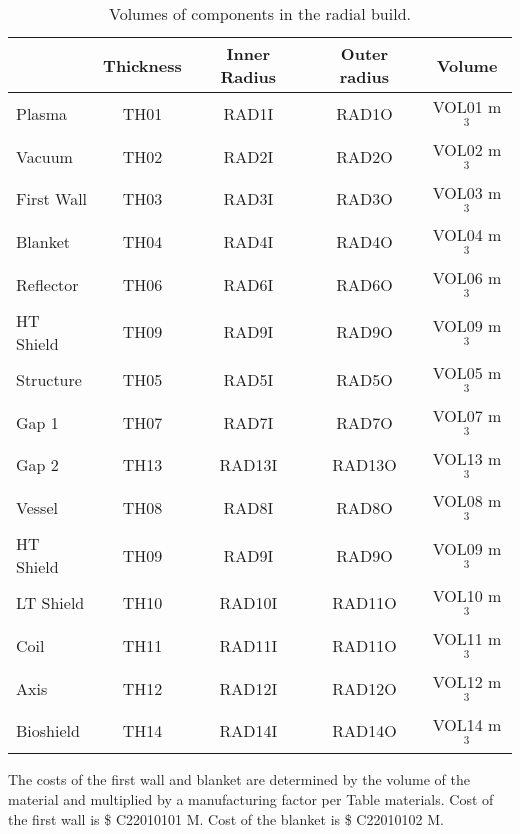 \begin{table}[ht!]
    \centering
    \begin{tabular}{l c  c c c}
    \hline
        &	Thickness	&	Inner Radius	&	Outer radius	&	Volume		\\
        \hline
Plasma	&	TH01	&	RAD1I	&	RAD1O	&	VOL01	m$^{3}$	\\
Vacuum	&	TH02	&	RAD2I	&	RAD2O	&	VOL02	m$^{3}$	\\
First Wall	&	TH03	&	RAD3I	&	RAD3O	&	VOL03	m$^{3}$	\\
Blanket	&	TH04	&	RAD4I	&	RAD4O	&	VOL04	m$^{3}$	\\
Reflector	&	TH06	&	RAD6I	&	RAD6O	&	VOL06	m$^{3}$	\\
HT Shield	&	TH09	&	RAD9I	&	RAD9O	&	VOL09	m$^{3}$	\\
Structure	&	TH05	&	RAD5I	&	RAD5O	&	VOL05	m$^{3}$	\\
Gap	1 &	TH07	&	RAD7I	&	RAD7O	&	VOL07	m$^{3}$	\\
Gap 2	&	TH13	&	RAD13I	&	RAD13O	&	VOL13	m$^{3}$	\\
Vessel	&	TH08	&	RAD8I	&	RAD8O	&	VOL08	m$^{3}$	\\
HT Shield	&	TH09	&	RAD9I	&	RAD9O	&	VOL09	m$^{3}$	\\
LT Shield	&	TH10	&	RAD10I	&	RAD11O	&	VOL10	m$^{3}$	\\
Coil	&	TH11	&	RAD11I	&	RAD11O	&	VOL11	m$^{3}$	\\
Axis	&	TH12	&	RAD12I	&	RAD12O	&	VOL12	m$^{3}$	\\
Bioshield	&	TH14	&	RAD14I	&	RAD14O	&	VOL14	m$^{3}$	\\

        \hline
    \end{tabular}
    \caption{Volumes of components in the radial build.}
    \label{tab:volumes}
\end{table}




The costs of the first wall and blanket are determined by the volume of the material and multiplied by a manufacturing factor per Table materials.
Cost of the first wall is \$ C22010101 M.  Cost of the blanket is \$ C22010102 M.

